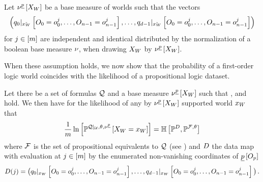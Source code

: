 \begin{assumption}
    \label{ass:independentTuples}
    Let $\nu^{\underline{p}}\left[X_{W}\right]$ be a base measure of worlds such that the vectors
    \begin{align}
        \label{eq:data}
        \left(  {q_{0}}|_{\tilde{x_{W}}} \left[O_{0}=o_{0}^j,\ldots,O_{n-1}=o_{n-1}^j\right], \ldots,
        {q_{d-1}}|_{\tilde{x_{W}}} \left[O_{0}=o_{0}^j,\ldots,O_{n-1}=o_{n-1}^j\right]
        \right)
    \end{align}
    for $j\in[m]$ are independent and identical distributed by the normalization of a boolean base measure $\nu$, when drawing $X_{W}$ by $\nu^{\underline{p}}\left[X_{W}\right]$.
\end{assumption}

When these assumption holds, we now show that the probability of a first-order logic world coincides with the likelihood of a propositional logic dataset.

\begin{theorem}
    \label{the:FOLworldToPLdataset}
    Let there be a set of formulas $\mathcal{Q}$ and a base measure $\nu^{\underline{p}}\left[X_{W}\right]$ such that ,  and  hold.
    We then have for the likelihood of any by $\nu^{\underline{p}}\left[X_{W}\right]$ supported world $x_{W}$ that
    \begin{align*}
        \frac{1}{m} \ln \left[ \mathbb{P}^{{\mathcal{Q}}|_{\mathcal{U}},\theta,\nu^{\underline{p}}}\left[X_{W}=x_{W}\right] \right]
        = \mathbb{H}\left[\mathbb{P}^{D},\mathbb{P}^{\mathcal{F},\theta}\right]
    \end{align*}
    where $\mathcal{F}$ is the set of propositional equivalents to $\mathcal{Q}$ (see ) and $D$ the data map with evaluation at $j\in[m]$ by the enumerated non-vanishing coordinates of $\underline{p}\left[O_{p}\right]$
    \begin{align*}
        D(j)
        = \big( {q_{0}}|_{x_{W}} \left[O_{0}=o_{0}^j,\ldots,O_{n-1}=o_{n-1}^j\right], \ldots ,
        {q_{d-1}}|_{x_{W}} \left[O_{0}=o_{0}^j,\ldots,O_{n-1}=o_{n-1}^j\right] \big) \, .
    \end{align*}
\end{theorem}


